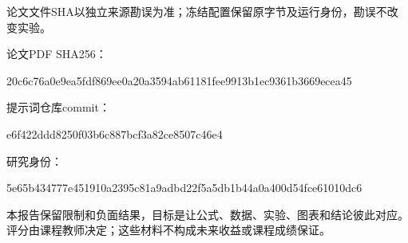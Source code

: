 \documentclass[UTF8,a4paper,10pt]{ctexart}
\begin{document}
论文文件SHA以独立来源勘误为准；冻结配置保留原字节及运行身份，勘误不改变实验。

{\scriptsize 论文PDF SHA256：\par\ttfamily 20c6c76a0e9ea5fdf869ee0a20a3594ab61181fee9913b1ec9361b3669ecea45\par}

{\scriptsize 提示词仓库commit：\par\ttfamily e6f422ddd8250f03b6c887bcf3a82ce8507c46e4\par}

{\scriptsize 研究身份：\par\ttfamily 5e65b434777e451910a2395c81a9adbd22f5a5db1b44a0a400d54fce61010dc6\par}

本报告保留限制和负面结果，目标是让公式、数据、实验、图表和结论彼此对应。评分由课程教师决定；这些材料不构成未来收益或课程成绩保证。
\end{document}

